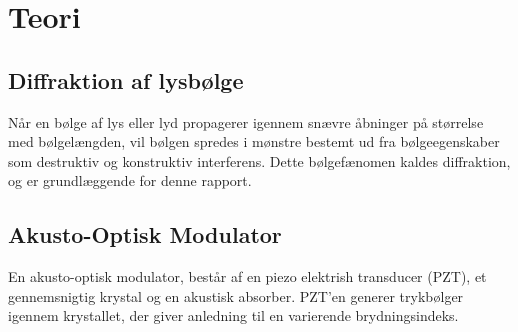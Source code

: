 \documentclass[main]{subfiles}
\begin{document}
\section{Teori}
\subsection{Diffraktion  af lysbølge}
Når en bølge af lys eller lyd propagerer igennem snævre åbninger på størrelse med bølgelængden, vil bølgen spredes i mønstre bestemt ud fra bølgeegenskaber som destruktiv og konstruktiv interferens. Dette bølgefænomen kaldes diffraktion, og er grundlæggende for denne rapport.


\subsection{Akusto-Optisk Modulator}
En akusto-optisk modulator, består af en piezo elektrish transducer (PZT), et gennemsnigtig krystal og en akustisk absorber. PZT'en generer trykbølger igennem krystallet, der giver anledning til en varierende brydningsindeks. 
\end{document}
